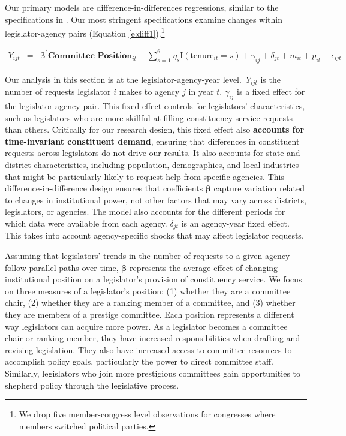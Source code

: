 \documentclass[12pt]{article}
\begin{document}
Our primary models are difference-in-differences regressions, similar to the specifications in \cite{BerryFowler2016}. Our most stringent specifications examine changes within legislator-agency pairs (Equation \ref{e:diff1}).\footnote{We drop five member-congress level observations for congresses where members switched political parties.} 

\begin{eqnarray}
Y_{ijt} & = & \boldsymbol{\beta}^{'} \textbf{Committee Position}_{it}  + \sum_{s = 1}^{6} \eta_{s} \text{I}\left(\text{tenure}_{it} = s\right) + \gamma_{ij} + \delta_{jt} + m_{it} + p_{it} + \epsilon_{ijt} \label{e:diff1}
\end{eqnarray}

Our analysis in this section is at the legislator-agency-year level. $Y_{ijt}$ is the number of requests legislator $i$ makes to agency $j$ in year $t$. $\gamma_{ij}$ is a fixed effect for the legislator-agency pair. This fixed effect controls for legislators' characteristics, such as legislators who are more skillful at filling constituency service requests than others. Critically for our research design, this fixed effect also \textbf{accounts for time-invariant constituent demand}, ensuring that differences in constituent requests across legislators do not drive our results. It also accounts for state and district characteristics, including population, demographics, and local industries that might be particularly likely to request help from specific agencies. This difference-in-difference design ensures that coefficients $\boldsymbol{\beta}$ capture variation related to changes in institutional power, not other factors that may vary across districts, legislators, or agencies. The model also accounts for the different periods for which data were available from each agency. $\delta_{jt}$ is an agency-year fixed effect. This takes into account agency-specific shocks that may affect legislator requests. 

Assuming that legislators' trends in the number of requests to a given agency follow parallel paths over time, $\boldsymbol{\beta}$ represents the average effect of changing institutional position on a legislator's provision of constituency service. We focus on three measures of a legislator's position: (1) whether they are a committee chair, (2) whether they are a ranking member of a committee, and (3) whether they are members of a prestige committee. Each position represents a different way legislators can acquire more power. As a legislator becomes a committee chair or ranking member, they have increased responsibilities when drafting and revising legislation. They also have increased access to committee resources to accomplish policy goals, particularly the power to direct committee staff. Similarly, legislators who join more prestigious committees gain opportunities to shepherd policy through the legislative process.
\end{document}

